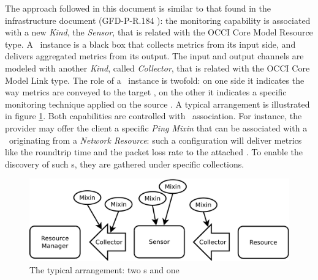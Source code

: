 \documentclass[12pt]{article}  %
\begin{document}
The approach followed in this document is similar to that found in the infrastructure document (GFD-P-R.184 \cite{occi:infr}): the monitoring capability is associated with a new {\em Kind}, the {\em Sensor}, that is related with the OCCI Core Model Resource type. A \sens\ instance is a black box that collects metrics from its input side, and delivers aggregated metrics from its output. The input and output channels are modeled with another {\em Kind}, called {\em Collector}, that is related with the OCCI Core Model Link type. The role of a \coll\ instance is twofold: on one side it indicates the way metrics are conveyed to the target \rs, on the other it indicates a specific monitoring technique applied on the source \rs. A typical arrangement is illustrated in figure \ref{fig:twostages}. Both capabilities are controlled with \mi\ association. For instance, the provider may offer the client a specific {\em Ping Mixin} that can be associated with a \coll\ originating from a {\em Network Resource}: such a configuration will deliver metrics like the roundtrip time and the packet loss rate to the attached \sens. To enable the discovery of such \mi s, they are gathered under specific collections.  

\begin{figure}
\centering
\includegraphics[width=0.7\linewidth]{twostages.pdf}
\caption{The typical arrangement: two \coll s and one \sens \label{fig:twostages}}
\end{figure}
\end{document}
